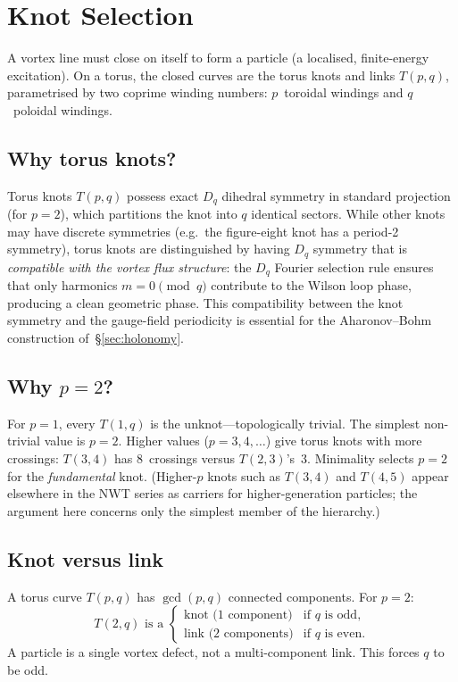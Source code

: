 \documentclass[11pt]{article}
\begin{document}
\section{Knot Selection}
\label{sec:knot-selection}

A vortex line must close on itself to form a particle (a localised,
finite-energy excitation).  On a torus, the closed curves are the
torus knots and links $T(p,q)$, parametrised by two coprime
winding numbers: $p$~toroidal windings and $q$~poloidal windings.

\subsection{Why torus knots?}
Torus knots $T(p,q)$ possess exact $D_q$ dihedral symmetry in
standard projection (for $p = 2$), which partitions the knot
into $q$ identical sectors.  While other knots may have discrete
symmetries (e.g.\ the figure-eight knot has a period-2 symmetry),
torus knots are distinguished by having $D_q$ symmetry that is
\emph{compatible with the vortex flux structure}: the $D_q$
Fourier selection rule ensures that only harmonics
$m = 0 \pmod{q}$ contribute to the Wilson loop phase, producing
a clean geometric phase.  This compatibility between the knot
symmetry and the gauge-field periodicity is essential for the
Aharonov--Bohm construction of~\S\ref{sec:holonomy}.

\subsection{Why $p = 2$?}

For $p = 1$, every $T(1,q)$ is the unknot---topologically trivial.
The simplest non-trivial value is $p = 2$.  Higher values ($p = 3,
4, \ldots$) give torus knots with more crossings: $T(3,4)$ has
8~crossings versus $T(2,3)$'s~3.  Minimality selects $p = 2$ for
the \emph{fundamental} knot.  (Higher-$p$ knots such as $T(3,4)$
and $T(4,5)$ appear elsewhere in the NWT series as carriers for
higher-generation particles; the argument here concerns only the
simplest member of the hierarchy.)

\subsection{Knot versus link}

A torus curve $T(p,q)$ has $\gcd(p,q)$ connected components.  For
$p = 2$:
\begin{equation}
T(2,q) \text{ is a }
\begin{cases}
\text{knot (1 component)} & \text{if } q \text{ is odd},\\
\text{link (2 components)} & \text{if } q \text{ is even}.
\end{cases}
\end{equation}
A particle is a single vortex defect, not a multi-component link.
This forces $q$ to be odd.
\end{document}
